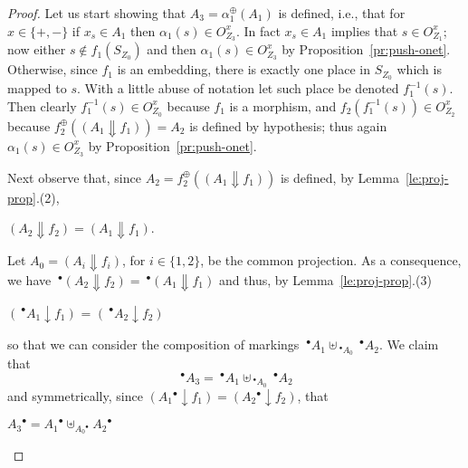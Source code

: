 \documentclass{LMCS}
\newcommand{\mjoin}{\ensuremath{\uplus}}
\newcommand{\monSub}[2]{\ensuremath{{#1}_{#2}^\oplus}}
\newcommand{\res}[2]{\ensuremath{({#1}\!\downarrow\!{#2})}}
\newcommand{\sres}[2]{\ensuremath{({#1}\!\Downarrow\!{#2})}}
\newcommand{\pre}[1][(\cdot)]{\ensuremath{\!~^\bullet{#1}}}
\newcommand{\post}[1][(\cdot)]{\ensuremath{{#1} {^\bullet}}}
\begin{document}
\begin{proof}
  Let us start showing that $A_3 = \monSub{\alpha}{1}(A_1)$ is
  defined, i.e., that for $x \in \{ +, -\}$ if $x_s \in A_1$ then
  $\alpha_1(s) \in O_{Z_3}^{x}$. In fact $x_s \in A_1$ implies that $s
  \in O_{Z_1}^{x}$; now either $s \not \in f_1(S_{Z_0})$ and then
  $\alpha_1(s) \in O_{Z_3}^{x}$ by
  Proposition~\ref{pr:push-onet}. Otherwise, since $f_1$ is an
  embedding, there is exactly one place in $S_{Z_0}$ which is mapped
  to $s$. With a little abuse of notation let such place be denoted
  $f_1^{-1}(s)$. Then clearly $f^{-1}_1(s) \in O_{Z_0}^{x}$ because
  $f_1$ is a morphism, and $f_2(f_1^{-1}(s)) \in O_{Z_2}^{x}$ because
  $\monSub{f}{2}(\sres{A_1}{f_1}) = A_2$ is defined by hypothesis;
  thus again $\alpha_1(s) \in O_{Z_3}^{x}$ by
  Proposition~\ref{pr:push-onet}.

  Next observe that, since $A_2 = \monSub{f}{2}(\sres{A_1}{f_1})$ is
  defined, by Lemma~\ref{le:proj-prop}.(2),
  \begin{center}
    $\sres{A_2}{f_2} = \sres{A_1}{f_1}$.
  \end{center}
  Let $A_0 =  \sres{A_i}{f_i}$, for $i \in \{ 1,2\}$, be the
  common projection. As a consequence, we have $\pre[\sres{A_2}{f_2}]=
  \pre[\sres{A_1}{f_1}]$ and thus, by Lemma~\ref{le:proj-prop}.(3)
  \begin{center}
    \res{\pre[A_1]}{f_1} = \res{\pre[A_2]}{f_2}
  \end{center}
  so that we can consider the composition of markings $\pre[A_1] \mjoin_{\pre[A_0]}
  \pre[A_2]$. We claim that
  \begin{equation}
    \label{eq:steps}
    \pre[A_3] = \pre[A_1] \mjoin_{\pre[A_0]} \pre[A_2]
  \end{equation}
  and symmetrically, since $\res{\post[A_1]}{f_1} =
  \res{\post[A_2]}{f_2}$, that 
  \begin{center}
    $\post[A_3] = \post[A_1] \mjoin_{\post[A_0]} \post[A_2]$
  \end{center}


\end{proof}
\end{document}
